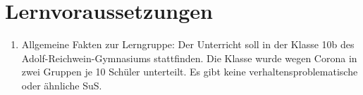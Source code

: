 \documentclass[11pt]{scrartcl}
\begin{document}
\section{Lernvoraussetzungen}
\begin{enumerate}
  \item  Allgemeine Fakten zur Lerngruppe:
  Der Unterricht soll in der Klasse 10b des Adolf-Reichwein-Gymnasiums stattfinden.
  Die Klasse wurde wegen Corona in zwei Gruppen je 10 Schüler unterteilt.
  Es gibt keine verhaltensproblematische oder ähnliche SuS.


\end{enumerate}
\end{document}
